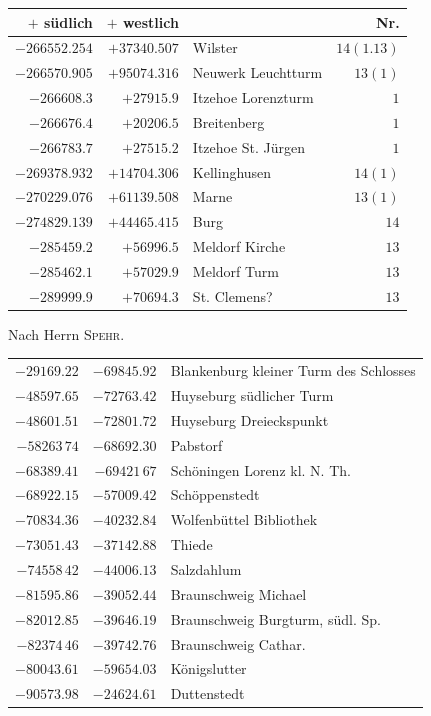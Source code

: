 \clearpage
\begin{center}\begingroup\fontsize{8}{9}\selectfont
\setlength{\tabcolsep}{4pt}
\begin{tabular}{r|r|p{170pt}|r}\hline
\(+\) südlich&\(+\) westlich&&Nr.\\\hline
\(-266552.254\)&\(+37340.507\)&Wilster&\(14(1.13)\)\\
\(-266570.905\)&\(+95074.316\)&Neuwerk Leuchtturm&\(13(1)\)\\
\(-266608.3\)&\(+27915.9\)&Itzehoe Lorenzturm&\(1\)\\
\(-266676.4\)&\(+20206.5\)&Breitenberg&\(1\)\\
\(-266783.7\)&\(+27515.2\)&Itzehoe St. Jürgen&\(1\)\\
\(-269378.932\)&\(+14704.306\)&Kellinghusen&\(14(1)\)\\
\(-270229.076\)&\(+61139.508\)&Marne&\(13(1)\)\\
\(-274829.139\)&\(+44465.415\)&Burg&\(14\)\\
\(-285459.2\)&\(+56996.5\)&Meldorf Kirche&\(13\)\\
\(-285462.1\)&\(+57029.9\)&Meldorf Turm&\(13\)\\
\(-289999.9\)&\(+70694.3\)&St. Clemens?&\(13\)\\
\hline\end{tabular}\endgroup\end{center}
\begin{center}Nach Herrn \textsc{Spehr}.\end{center}
\begin{center}\begingroup\fontsize{8}{9}\selectfont
\setlength{\tabcolsep}{4pt}
\begin{tabular}{rrp{190pt}}
\(-29169.22\)&\(-69845.92\)&Blankenburg kleiner Turm des Schlosses\\
\(-48597.65\)&\(-72763.42\)&Huyseburg südlicher Turm\\
\(-48601.51\)&\(-72801.72\)&Huyseburg Dreieckspunkt\\
\(-58263\,74\)&\(-68692.30\)&Pabstorf\\
\(-68389.41\)&\(-69421\,67\)&Schöningen Lorenz kl. N. Th.\\
\(-68922.15\)&\(-57009.42\)&Schöppenstedt\\
\(-70834.36\)&\(-40232.84\)&Wolfenbüttel Bibliothek\\
\(-73051.43\)&\(-37142.88\)&Thiede\\
\(-74558\,42\)&\(-44006.13\)&Salzdahlum\\
\(-81595.86\)&\(-39052.44\)&Braunschweig Michael\\
\(-82012.85\)&\(-39646.19\)&Braunschweig Burgturm, südl. Sp.\\
\(-82374\,46\)&\(-39742.76\)&Braunschweig Cathar.\\
\(-80043.61\)&\(-59654.03\)&Königslutter\\
\(-90573.98\)&\(-24624.61\)&Duttenstedt\\
\end{tabular}\endgroup\end{center}
